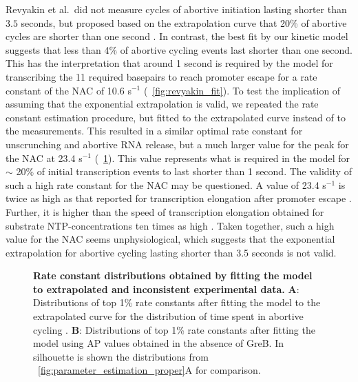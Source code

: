 Revyakin et al.\ did not measure cycles of abortive initiation lasting shorter
than $3.5$ seconds, but proposed based on the extrapolation curve that 20\% of
abortive cycles are shorter than one second \cite{revyakin_abortive_2006}. In
contrast, the best fit by our kinetic model suggests that less than 4\% of
abortive cycling events last shorter than one second. This has the
interpretation that around 1 second is required by the model for transcribing the 11 required
basepairs to reach promoter escape for a rate constant of the NAC of 10.6
s$^{-1}$ (\FIG~\ref{fig:revyakin_fit}). To test the implication of assuming
that the exponential extrapolation is valid, we repeated the rate constant
estimation procedure, but fitted to the extrapolated curve instead of to the
measurements. This resulted in a similar optimal rate constant for
unscrunching and abortive RNA release, but a much larger value for the peak
for the NAC at 23.4 s$^{-1}$ (\FIG~\ref{fig:extrap_and_GreB_minus_fit}). This
value represents what is required in the model for $\sim$ 20\% of initial
transcription events to last shorter than 1 second. The validity of such a
high rate constant for the NAC may be questioned. A value of 23.4 s$^{-1}$ is
twice as high as that reported for transcription elongation after promoter
escape \cite{revyakin_abortive_2006}. Further, it is higher than the speed of
transcription elongation obtained for substrate NTP-concentrations ten times
as high \cite{bai_mechanochemical_2007}. Taken together, such a high value for
the NAC seems unphysiological, which suggests that the exponential
extrapolation for abortive cycling lasting shorter than 3.5 seconds is not
valid.

\begin{figure}[h]
    \caption{
      {\bf Rate constant distributions obtained by fitting the model to
      extrapolated and inconsistent experimental data.} \textbf{A}:
      Distributions of top 1\% rate constants after fitting the model to the
      extrapolated curve for the distribution of time spent in abortive
      cycling \cite{revyakin_abortive_2006}. \textbf{B}: Distributions of top
      1\% rate constants after fitting the model using AP values obtained in the
      absence of GreB. In silhouette is shown the distributions from
      \FIG~\ref{fig:parameter_estimation_proper}A for comparison.}
      \label{fig:extrap_and_GreB_minus_fit}
\end{figure}

